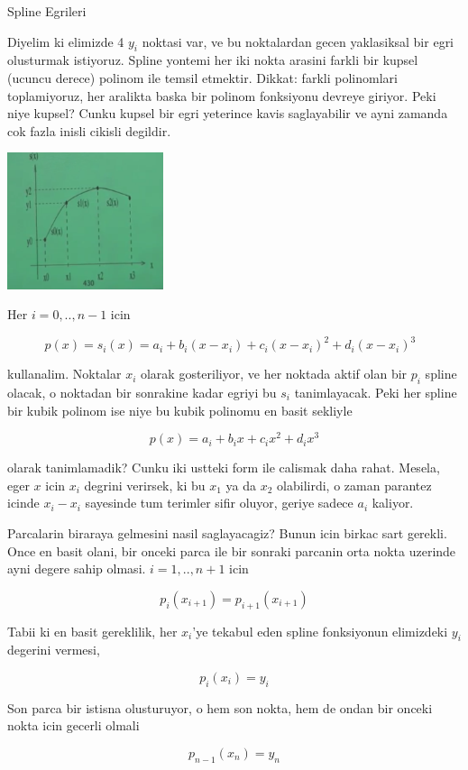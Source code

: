 \documentclass[12pt,fleqn]{article}\usepackage{common}
\begin{document}
Spline Egrileri

Diyelim ki elimizde 4 $y_i$ noktasi var, ve bu noktalardan gecen
yaklasiksal bir egri olusturmak istiyoruz. Spline yontemi her iki nokta
arasini farkli bir kupsel (ucuncu derece) polinom ile temsil
etmektir. Dikkat: farkli polinomlari toplamiyoruz, her aralikta baska bir
polinom fonksiyonu devreye giriyor. Peki niye kupsel? Cunku kupsel bir egri
yeterince kavis saglayabilir ve ayni zamanda cok fazla inisli cikisli
degildir.

\includegraphics[height=4cm]{spline1.png}

Her $i=0,..,n-1$ icin 

\[ p(x) = s_i(x) = a_i + b_i(x-x_i) + c_i(x-x_i)^2 + d_i(x-x_i)^3
\ \ \ \label{1}
\]

kullanalim. Noktalar $x_i$ olarak gosteriliyor, ve her noktada aktif olan
bir $p_i$ spline olacak, o noktadan bir sonrakine kadar egriyi bu $s_i$
tanimlayacak. Peki her spline bir kubik polinom ise niye bu kubik polinomu
en basit sekliyle 

\[ p(x) = a_i + b_ix + c_ix^2 + d_ix^3 \]

olarak tanimlamadik? Cunku iki ustteki form ile calismak daha
rahat. Mesela, eger $x$ icin $x_i$ degrini verirsek, ki bu $x_1$ ya da
$x_2$ olabilirdi, o zaman parantez icinde $x_i - x_i$ sayesinde tum terimler sifir
oluyor, geriye sadece $a_i$ kaliyor. 

Parcalarin biraraya gelmesini nasil saglayacagiz? Bunun icin birkac sart
gerekli. Once en basit olani, bir onceki parca ile bir sonraki parcanin orta
nokta uzerinde ayni degere sahip olmasi. $i=1,..,n+1$ icin

\[ p_i (x_{i+1}) = p_{i+1}(x_{i+1}) \]

Tabii ki en basit gereklilik, her $x_i$'ye tekabul eden spline fonksiyonun
elimizdeki $y_i$ degerini vermesi,

\[ p_i(x_i) = y_i \]

Son parca bir istisna olusturuyor, o hem son nokta, hem de ondan bir onceki
nokta icin gecerli olmali

\[ p_{n-1}(x_n) = y_n \]
\end{document}
